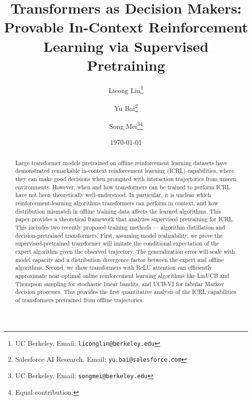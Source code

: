 \documentclass[10pt]{article}
\title{Transformers as Decision Makers: Provable In-Context Reinforcement Learning via Supervised Pretraining}
\date{\today}
\author{
  Licong Lin\thanks{UC Berkeley. Email: \texttt{liconglin@berkeley.edu}}\hspace{.35em}
  \and
  Yu Bai\thanks{Salesforce AI Research. Email: \texttt{yu.bai@salesforce.com}}\hspace{.35em}\footnotemark[4]
  \and
  Song Mei\thanks{UC Berkeley. Email: \texttt{songmei@berkeley.edu}}\hspace{.35em}\thanks{Equal contribution.}
}
\begin{document}
\maketitle


\begin{abstract}



Large transformer models pretrained on offline reinforcement learning datasets have demonstrated remarkable in-context reinforcement learning (ICRL) capabilities, where they can make good decisions when prompted with interaction trajectories from unseen environments. However, when and how transformers can be trained to perform ICRL have not been theoretically well-understood. In particular, it is unclear which reinforcement-learning algorithms transformers can perform in context, and how distribution mismatch in offline training data affects the learned algorithms. 
This paper provides a theoretical framework that analyzes supervised pretraining for ICRL. This includes two recently proposed training methods --- algorithm distillation and decision-pretrained transformers. First, assuming model realizability, we prove the supervised-pretrained transformer will imitate the conditional expectation of the expert algorithm given the observed trajectory. The generalization error will scale with model capacity and a distribution divergence factor between the expert and offline algorithms. Second, we show transformers with ReLU attention can efficiently approximate near-optimal online reinforcement learning algorithms like LinUCB and Thompson sampling for stochastic linear bandits, and UCB-VI for tabular Markov decision processes. This provides the first quantitative analysis of the ICRL capabilities of transformers pretrained from offline trajectories. 






\end{abstract}
\end{document}
